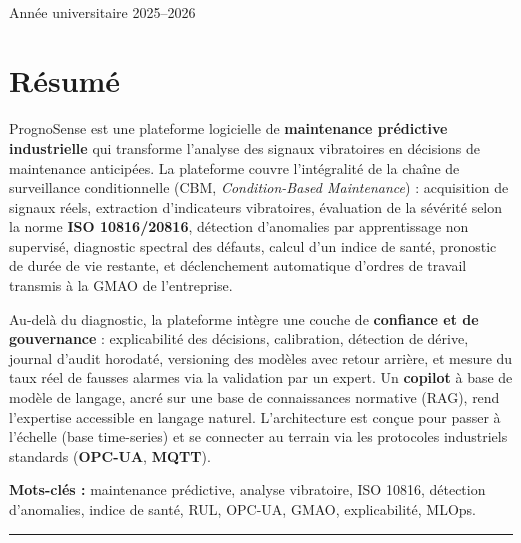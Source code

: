 \documentclass[12pt,a4paper]{article}
\begin{document}
\begin{titlepage}
\vspace{0.8cm}
\\[0.2cm]
{\small Année universitaire 2025--2026}
\end{titlepage}

\thispagestyle{fancy}
\section*{\color{psbleu}Résumé}

PrognoSense est une plateforme logicielle de \textbf{maintenance prédictive industrielle}
qui transforme l'analyse des signaux vibratoires en décisions de maintenance anticipées.
La plateforme couvre l'intégralité de la chaîne de surveillance conditionnelle (CBM,
\emph{Condition-Based Maintenance}) : acquisition de signaux réels, extraction
d'indicateurs vibratoires, évaluation de la sévérité selon la norme
\textbf{ISO 10816/20816}, détection d'anomalies par apprentissage non supervisé,
diagnostic spectral des défauts, calcul d'un indice de santé, pronostic de durée de vie
restante, et déclenchement automatique d'ordres de travail transmis à la GMAO de
l'entreprise.

Au-delà du diagnostic, la plateforme intègre une couche de \textbf{confiance et de
gouvernance} : explicabilité des décisions, calibration, détection de dérive, journal
d'audit horodaté, versioning des modèles avec retour arrière, et mesure du taux réel de
fausses alarmes via la validation par un expert. Un \textbf{copilot} à base de modèle de
langage, ancré sur une base de connaissances normative (RAG), rend l'expertise accessible
en langage naturel. L'architecture est conçue pour passer à l'échelle (base time-series)
et se connecter au terrain via les protocoles industriels standards (\textbf{OPC-UA},
\textbf{MQTT}).

\vspace{0.3cm}
\noindent\textbf{Mots-clés :} maintenance prédictive, analyse vibratoire, ISO 10816,
détection d'anomalies, indice de santé, RUL, OPC-UA, GMAO, explicabilité, MLOps.

\vspace{0.6cm}
\hrule
\vspace{0.4cm}
\end{document}
